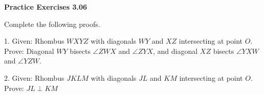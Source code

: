 \vspace{0.3ex}
\noindent\textbf{Practice Exercises 3.06}

\vspace{0.2ex}

Complete the following proofs.

\noindent \begin{minipage}[c]{0.35\textwidth}
1. Given: Rhombus \(WXYZ\) with diagonals \(WY\) and \(XZ\) intersecting at point \(O\).\\
Prove: Diagonal \(WY\) bisects \(\angle ZWX\) and \(\angle ZYX\), and diagonal \(XZ\) bisects \(\angle YXW\) and \(\angle YZW\).
\end{minipage}
\begin{minipage}[c]{0.14\textwidth}

\end{minipage}


\noindent \begin{minipage}[c]{0.35\textwidth}
2. Given: Rhombus \(JKLM\) with diagonals \(JL\) and \(KM\) intersecting at point \(O\).\\
Prove: \(JL \perp KM\)
\end{minipage}
\begin{minipage}[c]{0.14\textwidth}

\end{minipage}



